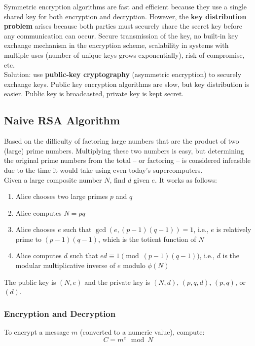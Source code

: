 Symmetric encryption algorithms are fast and efficient because they use a single shared key for both encryption and decryption.
However, the \textbf{key distribution problem} arises because both parties must securely share the secret key before any communication can occur. 
Secure transmission of the key, no built-in key exchange mechanism in the encryption scheme, scalability in systems with multiple uses (number of unique keys grows exponentially), risk of compromise, etc. \\

Solution: use \textbf{public-key cryptography} (asymmetric encryption) to securely exchange keys.
Public key encryption algorithms are slow, but key distribution is easier.
Public key is broadcasted, private key is kept secret.

\subsection{Naive RSA Algorithm}
Based on the difficulty of factoring large numbers that are the product of two (large) prime numbers.
Multiplying these two numbers is easy, but determining the original prime numbers from the total -- or factoring -- is considered infeasible due to the time it would take using even today's supercomputers. \\

Given a large composite number $N$, find $d$ given $e$. It works as follows:
\begin{enumerate}
\item Alice chooses two large primes $p$ and $q$
\item Alice computes $N = pq$
\item Alice chooses $e$ such that $\gcd(e, (p-1)(q-1)) = 1$, i.e., $e$ is relatively prime to $(p-1)(q-1)$, which is the totient function of $N$
\item Alice computes $d$ such that $ed \equiv 1 \pmod{(p-1)(q-1)}$, i.e., $d$ is the modular multiplicative inverse of $e$ modulo $\phi(N)$
\end{enumerate}

The public key is $(N, e)$ and the private key is $(N, d)$, $(p, q, d)$, $(p,q)$, or $(d)$. 

\subsubsection{Encryption and Decryption}
To encrypt a message $m$ (converted to a numeric value), compute:
\[ C = m^e \mod N \]

